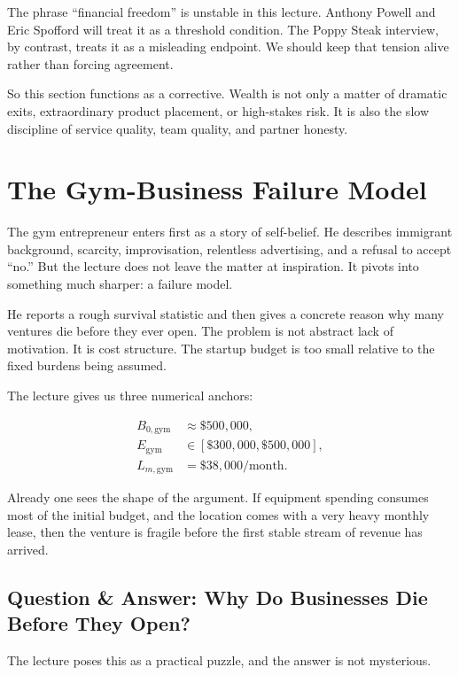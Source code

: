 \begin{remark}
The phrase ``financial freedom'' is unstable in this lecture. Anthony Powell and Eric Spofford will treat it as a threshold condition. The Poppy Steak interview, by contrast, treats it as a misleading endpoint. We should keep that tension alive rather than forcing agreement.
\end{remark}

So this section functions as a corrective. Wealth is not only a matter of dramatic exits, extraordinary product placement, or high-stakes risk. It is also the slow discipline of service quality, team quality, and partner honesty.

\section{The Gym-Business Failure Model}

The gym entrepreneur enters first as a story of self-belief. He describes immigrant background, scarcity, improvisation, relentless advertising, and a refusal to accept ``no.'' But the lecture does not leave the matter at inspiration. It pivots into something much sharper: a failure model.

He reports a rough survival statistic and then gives a concrete reason why many ventures die before they ever open. The problem is not abstract lack of motivation. It is cost structure. The startup budget is too small relative to the fixed burdens being assumed.

The lecture gives us three numerical anchors:

\begin{align}
B_{0,\mathrm{gym}} &\approx \$500{,}000,\\
E_{\mathrm{gym}} &\in [\$300{,}000,\$500{,}000],\\
L_{m,\mathrm{gym}} &= \$38{,}000/\mathrm{month}.
\end{align}

Already one sees the shape of the argument. If equipment spending consumes most of the initial budget, and the location comes with a very heavy monthly lease, then the venture is fragile before the first stable stream of revenue has arrived.

\subsection{Question \& Answer: Why Do Businesses Die Before They Open?}

The lecture poses this as a practical puzzle, and the answer is not mysterious.

